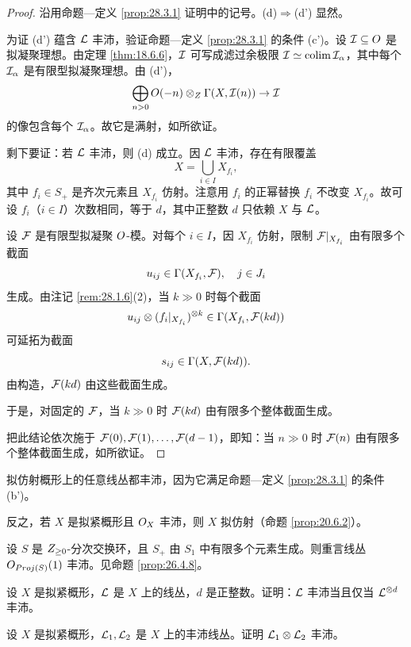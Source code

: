\begin{proof}
沿用命题—定义 \ref{prop:28.3.1} 证明中的记号。(d)$\Rightarrow$(d') 显然。

为证 (d') 蕴含 $\mathcal{L}$ 丰沛，验证命题—定义 \ref{prop:28.3.1} 的条件 (c')。设 $\mathcal{I}\subseteq O$ 是拟凝聚理想。由定理 \ref{thm:18.6.6}，$\mathcal{I}$ 可写成滤过余极限 $\mathcal{I}\simeq\operatorname*{colim}\mathcal{I}_\alpha$，其中每个 $\mathcal{I}_\alpha$ 是有限型拟凝聚理想。由 (d')，
\[
\bigoplus_{n>0}O(-n)\otimes_{Z}\Gamma(X,\mathcal{I}(n)) \to \mathcal{I}
\]
的像包含每个 $\mathcal{I}_\alpha$。故它是满射，如所欲证。

剩下要证：若 $\mathcal{L}$ 丰沛，则 (d) 成立。因 $\mathcal{L}$ 丰沛，存在有限覆盖
\[
X=\bigcup_{i\in I}X_{f_i},
\]
其中 $f_i\in S_+$ 是齐次元素且 $X_{f_i}$ 仿射。注意用 $f_i$ 的正幂替换 $f_i$ 不改变 $X_{f_i}$。故可设 $f_i$（$i\in I$）次数相同，等于 $d$，其中正整数 $d$ 只依赖 $X$ 与 $\mathcal{L}$。

设 $\mathcal{F}$ 是有限型拟凝聚 $O$-模。对每个 $i\in I$，因 $X_{f_i}$ 仿射，限制 $\mathcal{F}|_{X_{f_i}}$ 由有限多个截面
\[
u_{ij}\in\Gamma(X_{f_i},\mathcal{F}),\quad j\in J_i
\]
生成。由注记 \ref{rem:28.1.6}(2)，当 $k\gg 0$ 时每个截面
\[
u_{ij}\otimes (f_i|_{X_{f_i}})^{\otimes k}\in\Gamma(X_{f_i},\mathcal{F}(kd))
\]
可延拓为截面
\[
s_{ij}\in\Gamma(X,\mathcal{F}(kd)).
\]
由构造，$\mathcal{F}(kd)$ 由这些截面生成。

于是，对固定的 $\mathcal{F}$，当 $k\gg 0$ 时 $\mathcal{F}(kd)$ 由有限多个整体截面生成。

把此结论依次施于 $\mathcal{F}(0),\mathcal{F}(1),\ldots,\mathcal{F}(d-1)$，即知：当 $n\gg 0$ 时 $\mathcal{F}(n)$ 由有限多个整体截面生成，如所欲证。
\end{proof}

\begin{example}\label{ex:28.3.4}
拟仿射概形上的任意线丛都丰沛，因为它满足命题—定义 \ref{prop:28.3.1} 的条件 (b')。

反之，若 $X$ 是拟紧概形且 $O_X$ 丰沛，则 $X$ 拟仿射（命题 \ref{prop:20.6.2}）。
\end{example}

\begin{example}\label{ex:28.3.5}
设 $S$ 是 $Z_{\ge 0}$-分次交换环，且 $S_+$ 由 $S_1$ 中有限多个元素生成。则重言线丛 $O_{Proj(S)}(1)$ 丰沛。见命题 \ref{prop:26.4.8}。
\end{example}

\begin{exercise}\label{exc:28.3.6}
设 $X$ 是拟紧概形，$\mathcal{L}$ 是 $X$ 上的线丛，$d$ 是正整数。证明：$\mathcal{L}$ 丰沛当且仅当 $\mathcal{L}^{\otimes d}$ 丰沛。
\end{exercise}

\begin{exercise}\label{exc:28.3.7}
设 $X$ 是拟紧概形，$\mathcal{L}_1,\mathcal{L}_2$ 是 $X$ 上的丰沛线丛。证明 $\mathcal{L}_1\otimes\mathcal{L}_2$ 丰沛。
\end{exercise}

